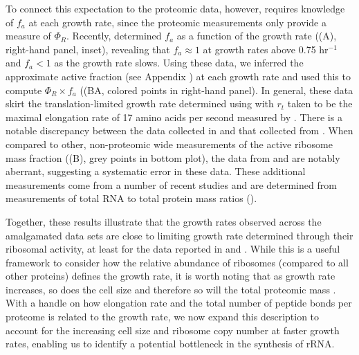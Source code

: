 To connect this expectation to the proteomic data, however, requires knowledge
of $f_a$ at each growth rate, since the proteomic measurements only provide a
measure of $\Phi_R$. Recently, \cite{dai2016} determined $f_a$ as a function of
the growth rate ((A), right-hand panel, inset), revealing
that $f_a \approx 1$ at growth rates above 0.75 hr$^{-1}$ and $f_a < 1$ as the
growth rate slows. Using these data, we inferred the approximate active fraction
(see Appendix ) at each growth rate and used this to compute
$\Phi_R \times f_a$ ((BA, colored points in right-hand
panel). In general, these data skirt the translation-limited growth rate
determined using  with $r_t$ taken to be the maximal elongation
rate of 17 amino acids per second measured by \cite{dai2016}. There is a notable
discrepancy between the data collected in \cite{schmidt2016, li2014} and that
collected from \cite{valgepea2013, peebo2015}. When compared to other,
non-proteomic wide measurements of the active ribosome mass fraction
((B), grey points in bottom plot), the data from
\cite{valgepea2013} and \cite{peebo2015} are notably aberrant, suggesting a
systematic error in these data. These additional measurements come from a number
of recent studies and are determined from measurements of total RNA to total
protein mass ratios ().

Together, these results illustrate that the growth rates observed across the
amalgamated data sets are close to limiting growth rate determined through their
ribosomal  activity, at least for the data reported in \cite{schmidt2016} and
\cite{li2014}. While this is a useful framework to consider how the relative
abundance of ribosomes (compared to all other proteins) defines the growth rate,
it is worth noting that as growth rate increases, so does the cell size and
therefore so will the total proteomic mass \citep{basan2015}. With a handle on
how elongation rate and the total number of peptide bonds per proteome is
related to the growth rate, we now expand this description to account for the
increasing cell size and ribosome copy number at faster growth rates,  enabling
us to identify a potential bottleneck in the synthesis of rRNA.

